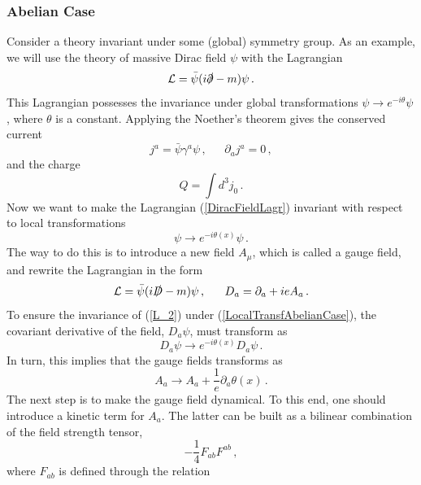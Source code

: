 \documentclass[11pt,a4paper]{article}
\begin{document}
\subsubsection{Abelian Case}
Consider a theory invariant under some (global) symmetry group. As an example, we will use the theory of massive Dirac field $\psi$ with the Lagrangian
\begin{equation}\label{DiracFieldLagr}
\mathcal{L}=\bar{\psi}(i\slashed{\partial}-m)\psi   \,.
\end{equation}
This Lagrangian possesses the invariance under global transformations $\psi\rightarrow e^{-i\theta}\psi$, where $\theta$ is a constant. Applying the Noether's theorem gives the conserved current
\begin{equation}\label{CurrentAbelianCase}
j^a=\bar{\psi}\gamma^a\psi  \,,~~~~~~~\partial_a j^a=0   \,,
\end{equation}
and the charge
\begin{equation}
Q=\int d^3 j_0   \,.
\end{equation}
Now we want to make the Lagrangian (\ref{DiracFieldLagr}) invariant with respect to local transformations
\begin{equation}\label{LocalTransfAbelianCase}
\psi\rightarrow e^{-i\theta(x)}\psi   \,.
\end{equation}
The way to do this is to introduce a new field $A_\mu$, which is called a gauge field, and rewrite the Lagrangian in the form
\begin{equation}\label{L_2}
\mathcal{L}=\bar{\psi}(i\slashed{D}-m)\psi   \,,~~~~~ D_a=\partial_a+ieA_a   \,.
\end{equation}
To ensure the invariance of (\ref{L_2}) under (\ref{LocalTransfAbelianCase}), the covariant derivative of the field, $D_a\psi$, must transform as
\begin{equation}
D_a\psi\rightarrow e^{-i\theta(x)}D_a\psi  \,.
\end{equation}
In turn, this implies that the gauge fields transforms as
\begin{equation}
A_a\rightarrow A_a +\dfrac{1}{e}\partial_a\theta(x)  \,.
\end{equation}
The next step is to make the gauge field dynamical. To this end, one should introduce a kinetic term for $A_a$. The latter can be built as a bilinear combination of the field strength tensor,
\begin{equation}\label{KineticTermAbelianCase}
-\dfrac{1}{4}F_{ab}F^{ab}   \,,
\end{equation}
where $F_{ab}$ is defined through the relation
\end{document}
